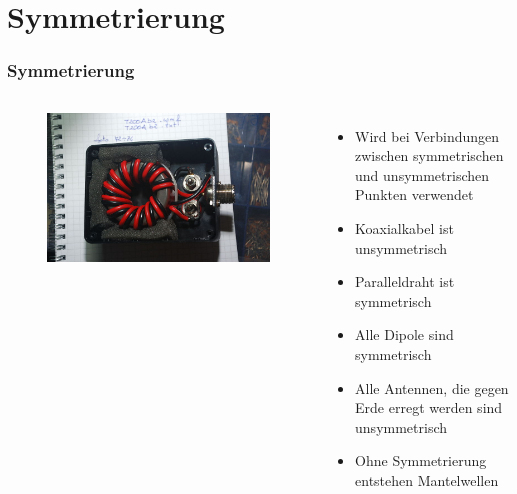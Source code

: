 \section{Symmetrierung}
\begin{frame}
  \frametitle{Symmetrierung}
  \begin{columns}
    \begin{figure}
      \includegraphics[width=\textwidth,height=.8\textheight,keepaspectratio]{a10/balun.jpg}
    \end{figure}
    \begin{itemize}
      \item Wird bei Verbindungen zwischen symmetrischen und unsymmetrischen Punkten verwendet
      \item Koaxialkabel ist unsymmetrisch
      \item Paralleldraht ist symmetrisch
      \item Alle Dipole sind symmetrisch
      \item Alle Antennen, die gegen Erde erregt werden sind unsymmetrisch
      \item Ohne Symmetrierung entstehen Mantelwellen
    \end{itemize}
  \end{columns}
\end{frame}

